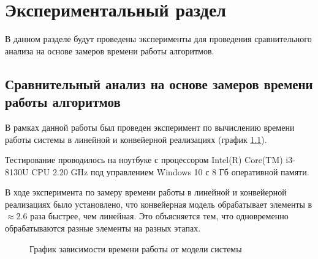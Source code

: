 \chapter{Экспериментальный раздел}
\label{cha:research}
    В данном разделе будут проведены эксперименты для проведения 
    сравнительного анализа на основе замеров времени работы алгоритмов.

    \section{Сравнительный анализ на основе замеров времени работы алгоритмов}
        В рамках данной работы был проведен эксперимент по вычислению времени работы системы в линейной и конвейерной реализациях (график \ref{graph:test:models}).



        Тестирование проводилось на ноутбуке с процессором
        Intel(R) Core(TM) i3-8130U CPU 2.20 GHz \cite{processor-i5-7200u}
        под управлением Windows 10 с 8 Гб оперативной памяти.

        В ходе эксперимента по замеру времени работы в линейной и конвейерной реализациях было установлено,
        что конвейерная модель обрабатывает элементы в $ \approx 2.6 $ раза
        быстрее, чем линейная. Это объясняется тем,
        что одновременно обрабатываются разные элементы на разных этапах.
        



    \begin{figure}[h!]
        \centering
        \caption{График зависимости времени работы от модели системы} 
        \label{graph:test:models}
    \end{figure}



\newpage